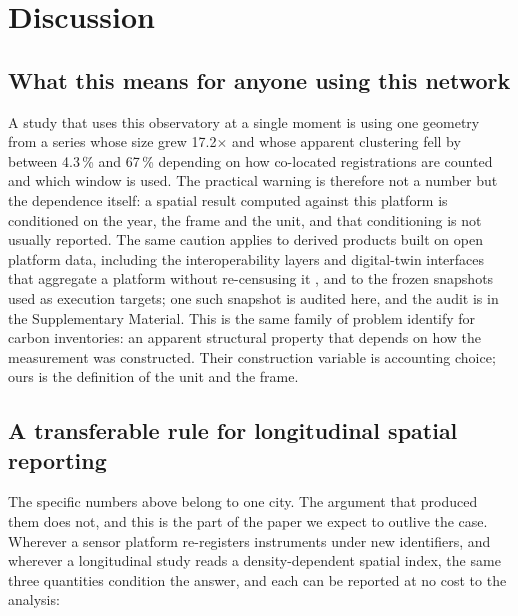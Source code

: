 \documentclass[fleqn,10pt,lineno]{wlpeerj}
\newcommand{\growth}{17.2}
\begin{document}
\section*{Discussion}
\label{sec:discussion}

\subsection*{What this means for anyone using this network}
\label{sec:disc-longitudinal}

A study that uses this observatory at a single moment is using one geometry from a series whose
size grew \growth$\times$ and whose apparent clustering fell by between 4.3\,\% and 67\,\%
depending on how co-located registrations are counted and which window is used. The practical
warning is therefore not a number but the dependence itself: a spatial result computed against
this platform is conditioned on the year, the frame and the unit, and that conditioning is not
usually reported. The same caution applies to derived products built on open platform data,
including the interoperability layers and digital-twin interfaces that aggregate a platform
without re-censusing it \citep{anthony2024enabling}, and to the frozen snapshots used as
execution targets; one such snapshot is audited here, and the audit is in the Supplementary
Material. This is the same family of problem \citet{xia2026measurement} identify for carbon inventories: an apparent structural property
that depends on how the measurement was constructed. Their construction variable is accounting
choice; ours is the definition of the unit and the frame.

\subsection*{A transferable rule for longitudinal spatial reporting}
\label{sec:disc-transfer}

The specific numbers above belong to one city. The argument that produced them does not, and
this is the part of the paper we expect to outlive the case. Wherever a sensor platform
re-registers instruments under new identifiers, and wherever a longitudinal study reads a
density-dependent spatial index, the same three quantities condition the answer, and each can be
reported at no cost to the analysis:
\end{document}
